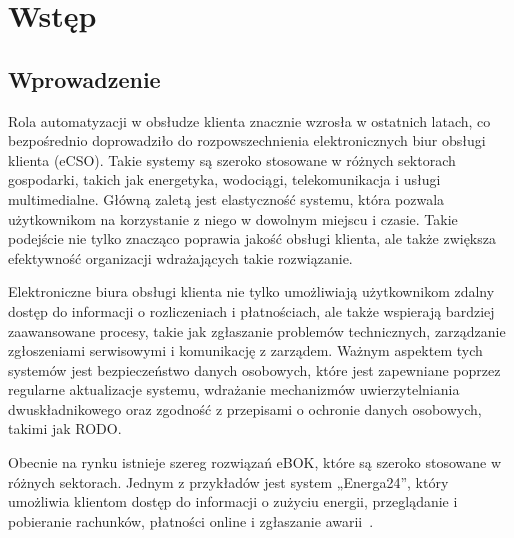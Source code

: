 \chapter{Wstęp}
\section{Wprowadzenie}
Rola automatyzacji w obsłudze klienta znacznie wzrosła w ostatnich latach, co bezpośrednio doprowadziło do rozpowszechnienia elektronicznych biur obsługi klienta (eCSO). 
Takie systemy są szeroko stosowane w różnych sektorach gospodarki, takich jak energetyka, wodociągi, telekomunikacja i usługi multimedialne. Główną zaletą jest elastyczność systemu, która pozwala użytkownikom na korzystanie z niego w dowolnym miejscu i czasie. Takie podejście nie tylko znacząco poprawia jakość obsługi klienta, ale także zwiększa efektywność organizacji wdrażających takie rozwiązanie.

Elektroniczne biura obsługi klienta nie tylko umożliwiają użytkownikom zdalny dostęp do informacji o rozliczeniach i płatnościach, ale także wspierają bardziej zaawansowane procesy, takie jak zgłaszanie problemów technicznych, zarządzanie zgłoszeniami serwisowymi i komunikację z zarządem. Ważnym aspektem tych systemów jest bezpieczeństwo danych osobowych, które jest zapewniane poprzez regularne aktualizacje systemu, wdrażanie mechanizmów uwierzytelniania dwuskładnikowego oraz zgodność z przepisami o ochronie danych osobowych, takimi jak RODO.


Obecnie na rynku istnieje szereg rozwiązań eBOK, które są szeroko stosowane w różnych sektorach. Jednym z przykładów jest system „Energa24”, który umożliwia klientom dostęp do informacji o zużyciu energii, przeglądanie i pobieranie rachunków, płatności online i zgłaszanie awarii~\cite{energa}. 


